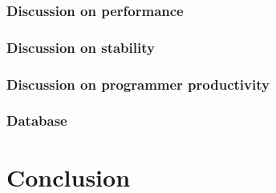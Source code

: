 \documentclass[a4paper]{article}
\begin{document}
\subsubsection{Discussion on performance}
\subsubsection{Discussion on stability}
\subsubsection{Discussion on programmer productivity}





\subsubsection{Database}


\section{Conclusion}
\end{document}
